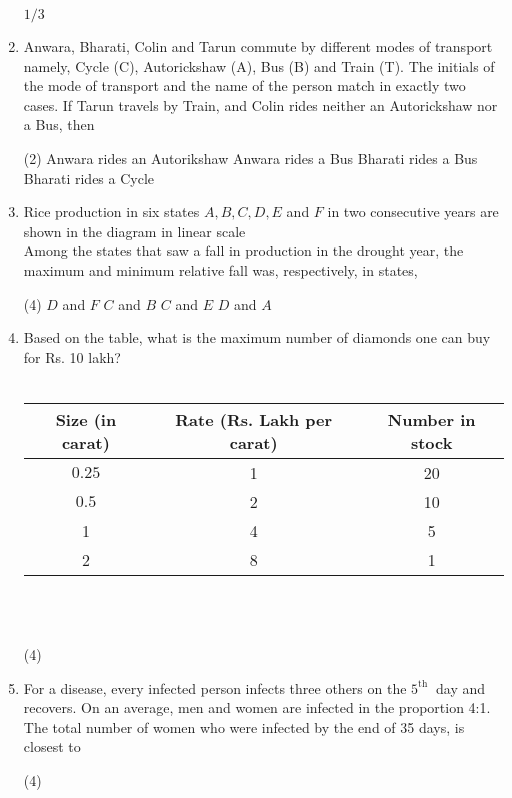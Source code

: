 \begin{enumerate}
\begin{tasks}
	\task[\textbf{d.}] $1 / 3$
\end{tasks}
\item Anwara, Bharati, Colin and Tarun commute by different modes of transport namely, Cycle (C), Autorickshaw (A), Bus (B) and Train (T). The initials of the mode of transport and the name of the person match in exactly two cases. If Tarun travels by Train, and Colin rides neither an Autorickshaw nor a Bus, then 
 \begin{tasks}(2)
	\task[\textbf{a.}]Anwara rides an Autorikshaw
	\task[\textbf{b.}]Anwara rides a Bus
	\task[\textbf{c.}]Bharati rides a Bus
	\task[\textbf{d.}] Bharati rides a Cycle
\end{tasks}
\item Rice production in six states $A, B, C, D, E$ and $F$ in two consecutive years are shown in the diagram in linear scale\\
Among the states that saw a fall in production in the drought year, the maximum and minimum relative fall was, respectively, in states,
 \begin{tasks}(4)
	\task[\textbf{a.}]$D$ and $F$
	\task[\textbf{b.}]$C$ and $B$
	\task[\textbf{c.}]$C$ and $E$
	\task[\textbf{d.}] $D$ and $A$
\end{tasks}
\item  Based on the table, what is the maximum number of diamonds one can buy for Rs. 10 lakh?\\\\
\begin{tabular}{|c|c|c|}
	\hline Size (in carat) & Rate (Rs. Lakh per carat) & Number in stock \\
	\hline $0.25$ & 1 & 20 \\
	\hline $0.5$ & 2 & 10 \\
	\hline 1 & 4 & 5 \\
	\hline 2 & 8 & 1 \\
	\hline
\end{tabular}\\\\
 \begin{tasks}(4)
\end{tasks}
\item For a disease, every infected person infects three others on the $5^{\text {th }}$ day and recovers. On an average, men and women are infected in the proportion 4:1. The total number of women who were infected by the end of 35 days, is closest to
 \begin{tasks}(4)

\end{tasks}
\end{enumerate}
